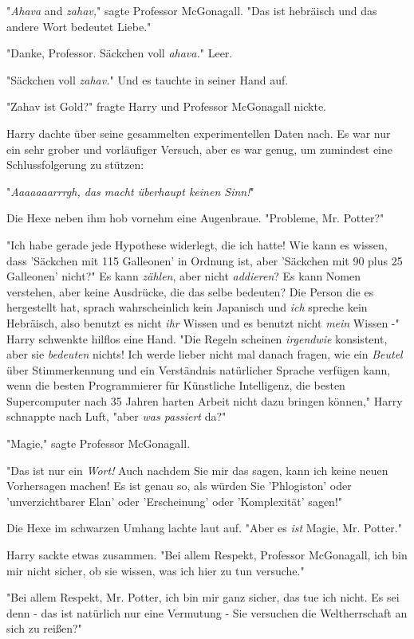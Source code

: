 {"\emph{Ahava} and \emph{zahav,}" sagte Professor McGonagall. "Das ist hebräisch und das andere Wort bedeutet Liebe."

"Danke, Professor. Säckchen voll \emph{ahava.}" Leer.

"Säckchen voll \emph{zahav.}" Und es tauchte in seiner Hand auf.

"Zahav ist Gold?" fragte Harry und Professor McGonagall nickte.

Harry dachte über seine gesammelten experimentellen Daten nach. Es war nur ein sehr grober und vorläufiger Versuch, aber es war genug, um zumindest eine Schlussfolgerung zu stützen:

"\emph{Aaaaaaarrrgh, das macht überhaupt keinen Sinn!}"

Die Hexe neben ihm hob vornehm eine Augenbraue. "Probleme, Mr. Potter?"

"Ich habe gerade jede Hypothese widerlegt, die ich hatte! Wie kann es wissen, dass 'Säckchen mit 115 Galleonen' in Ordnung ist, aber 'Säckchen mit 90 plus 25 Galleonen' nicht?" Es kann \emph{zählen}, aber nicht \emph{addieren}? Es kann Nomen verstehen, aber keine Ausdrücke, die das selbe bedeuten? Die Person die es hergestellt hat, sprach wahrscheinlich kein Japanisch und \emph{ich} spreche kein Hebräisch, also benutzt es nicht \emph{ihr} Wissen und es benutzt nicht \emph{mein} Wissen -" Harry schwenkte hilflos eine Hand. "Die Regeln scheinen \emph{irgendwie} konsistent, aber sie \emph{bedeuten} nichts! Ich werde lieber nicht mal danach fragen, wie ein \emph{Beutel} über Stimmerkennung und ein Verständnis natürlicher Sprache verfügen kann, wenn die besten Programmierer für Künstliche Intelligenz, die besten Supercomputer nach 35 Jahren harten Arbeit nicht dazu bringen können," Harry schnappte nach Luft, "aber \emph{was passiert} da?"

"Magie," sagte Professor McGonagall.

"Das ist nur ein \emph{Wort!} Auch nachdem Sie mir das sagen, kann ich keine neuen Vorhersagen machen! Es ist genau so, als würden Sie 'Phlogiston' oder 'unverzichtbarer Elan' oder 'Erscheinung' oder 'Komplexität' sagen!"

Die Hexe im schwarzen Umhang lachte laut auf. "Aber es \emph{ist} Magie, Mr. Potter."

Harry sackte etwas zusammen. "Bei allem Respekt, Professor McGonagall, ich bin mir nicht sicher, ob sie wissen, was ich hier zu tun versuche."

"Bei allem Respekt, Mr. Potter, ich bin mir ganz sicher, das tue ich nicht. Es sei denn - das ist natürlich nur eine Vermutung - Sie versuchen die Weltherrschaft an sich zu reißen?"

}

